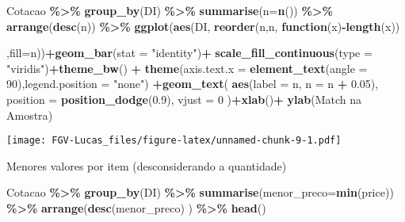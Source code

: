 \documentclass[
]{article}
\newenvironment{Shaded}{\begin{snugshade}}{\end{snugshade}}
\newcommand{\ControlFlowTok}[1]{\textcolor[rgb]{0.13,0.29,0.53}{\textbf{#1}}}
\newcommand{\DataTypeTok}[1]{\textcolor[rgb]{0.13,0.29,0.53}{#1}}
\newcommand{\DecValTok}[1]{\textcolor[rgb]{0.00,0.00,0.81}{#1}}
\newcommand{\FloatTok}[1]{\textcolor[rgb]{0.00,0.00,0.81}{#1}}
\newcommand{\KeywordTok}[1]{\textcolor[rgb]{0.13,0.29,0.53}{\textbf{#1}}}
\newcommand{\NormalTok}[1]{#1}
\newcommand{\OperatorTok}[1]{\textcolor[rgb]{0.81,0.36,0.00}{\textbf{#1}}}
\newcommand{\StringTok}[1]{\textcolor[rgb]{0.31,0.60,0.02}{#1}}
\begin{document}
\begin{Shaded}
\begin{Highlighting}[]
\NormalTok{Cotacao }\OperatorTok{\%\textgreater{}\%}\StringTok{ }\KeywordTok{group\_by}\NormalTok{(DI) }\OperatorTok{\%\textgreater{}\%}\StringTok{ }\KeywordTok{summarise}\NormalTok{(}\DataTypeTok{n=}\KeywordTok{n}\NormalTok{()) }\OperatorTok{\%\textgreater{}\%}\StringTok{ }\KeywordTok{arrange}\NormalTok{(}\KeywordTok{desc}\NormalTok{(n)) }\OperatorTok{\%\textgreater{}\%}
\StringTok{    }\KeywordTok{ggplot}\NormalTok{(}\KeywordTok{aes}\NormalTok{(DI,}
               \KeywordTok{reorder}\NormalTok{(n,n,}
                       \ControlFlowTok{function}\NormalTok{(x)}\OperatorTok{{-}}\KeywordTok{length}\NormalTok{(x))}
               
\NormalTok{               ,}\DataTypeTok{fill=}\NormalTok{n))}\OperatorTok{+}\KeywordTok{geom\_bar}\NormalTok{(}\DataTypeTok{stat =} \StringTok{"identity"}\NormalTok{)}\OperatorTok{+}\StringTok{ }
\StringTok{    }\KeywordTok{scale\_fill\_continuous}\NormalTok{(}\DataTypeTok{type =} \StringTok{"viridis"}\NormalTok{)}\OperatorTok{+}\KeywordTok{theme\_bw}\NormalTok{() }\OperatorTok{+}
\StringTok{    }\KeywordTok{theme}\NormalTok{(}\DataTypeTok{axis.text.x =} \KeywordTok{element\_text}\NormalTok{(}\DataTypeTok{angle =} \DecValTok{90}\NormalTok{),}\DataTypeTok{legend.position =} \StringTok{"none"}\NormalTok{) }\OperatorTok{+}\KeywordTok{geom\_text}\NormalTok{(}
      \KeywordTok{aes}\NormalTok{(}\DataTypeTok{label =}\NormalTok{ n, }\DataTypeTok{n =}\NormalTok{ n }\OperatorTok{+}\StringTok{ }\FloatTok{0.05}\NormalTok{),}
      \DataTypeTok{position =} \KeywordTok{position\_dodge}\NormalTok{(}\FloatTok{0.9}\NormalTok{),}
      \DataTypeTok{vjust =} \DecValTok{0}
\NormalTok{    )}\OperatorTok{+}\KeywordTok{xlab}\NormalTok{(}\StringTok{\textquotesingle{}\textquotesingle{}}\NormalTok{)}\OperatorTok{+}\StringTok{ }
\StringTok{    }\KeywordTok{ylab}\NormalTok{(}\StringTok{\textquotesingle{}Match na Amostra\textquotesingle{}}\NormalTok{)}
\end{Highlighting}
\end{Shaded}

\texttt{[image: FGV-Lucas\_files/figure-latex/unnamed-chunk-9-1.pdf]}

Menores valores por item (desconsiderando a quantidade)

\begin{Shaded}
\begin{Highlighting}[]
\NormalTok{ Cotacao }\OperatorTok{\%\textgreater{}\%}\StringTok{ }\KeywordTok{group\_by}\NormalTok{(DI) }\OperatorTok{\%\textgreater{}\%}\StringTok{ }\KeywordTok{summarise}\NormalTok{(}\DataTypeTok{menor\_preco=}\KeywordTok{min}\NormalTok{(price)) }\OperatorTok{\%\textgreater{}\%}\StringTok{ }\KeywordTok{arrange}\NormalTok{(}\KeywordTok{desc}\NormalTok{(menor\_preco) ) }\OperatorTok{\%\textgreater{}\%}
\StringTok{     }\KeywordTok{head}\NormalTok{()}
\end{Highlighting}
\end{Shaded}
\end{document}
